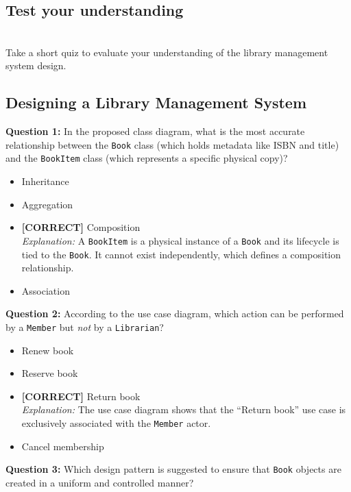 \subsection{Test your understanding}\label{oF75UH3T8-XoizUIdndDo}
\\
Take a short quiz to evaluate your understanding of the library management system design.

\subsection*{Designing a Library Management System}
\vspace{0.3cm}
\noindent
\textbf{Question 1:} In the proposed class diagram, what is the most accurate relationship between the \texttt{Book} class (which holds metadata like ISBN and title) and the \texttt{BookItem} class (which represents a specific physical copy)?
\\[0.2cm]
\begin{itemize}
 \item Inheritance
 \item Aggregation
 \item \textbf{[CORRECT]} Composition
\\[0.1cm]
\textit{Explanation:} 
A \texttt{BookItem} is a physical instance of a \texttt{Book} and its lifecycle is tied to the \texttt{Book}. It cannot exist independently, which defines a composition relationship.
 \item Association
\end{itemize}
\vspace{0.3cm}
\noindent
\textbf{Question 2:} According to the use case diagram, which action can be performed by a \texttt{Member} but \emph{not} by a \texttt{Librarian}?
\\[0.2cm]
\begin{itemize}
 \item Renew book
 \item Reserve book
 \item \textbf{[CORRECT]} Return book
\\[0.1cm]
\textit{Explanation:} 
The use case diagram shows that the ``Return book'' use case is exclusively associated with the \texttt{Member} actor.
 \item Cancel membership
\end{itemize}
\vspace{0.3cm}
\noindent
\textbf{Question 3:} Which design pattern is suggested to ensure that \texttt{Book} objects are created in a uniform and controlled manner?
